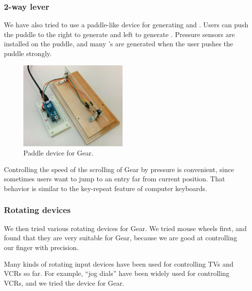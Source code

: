 \documentclass[conference]{IEEEtran}
\def\up{\tsf{▲}}
\def\down{\tsf{▼}}
\begin{document}
%


\subsubsection{2-way lever}

We have also tried to use a paddle-like device for generating {\up} and {\down}.
Users can push the puddle to the right to generate {\up} and
left to generate {\down}.
Pressure sensors are installed on the puddle, and
many {\up}'s are generated when the user pushes the puddle strongly.

\begin{figure}[H]
  \centerline{\includegraphics[width=54mm,bb=0 0 514 418]{figures/3c2de63899653056f3c6be835b9aaf43.png}}
\caption{Paddle device for Gear.}
\label{paddle}
\end{figure}

Controlling the speed of the scrolling of Gear by pressure is convenient,
since sometimes users want to jump to an entry far from current position.
That behavior is similar to the key-repeat feature of computer keyboards.


\subsubsection{Rotating devices}

We then tried various rotating devices for Gear.
%
We tried mouse wheels first, and found that they are very suitable for Gear,
because we are good at controlling our finger with precision.

Many kinds of rotating input devices have been used for controlling TVs and VCRs so far.
For example, ``jog dials'' have been widely used for controlling VCRs, and we tried the device for Gear.
\end{document}
